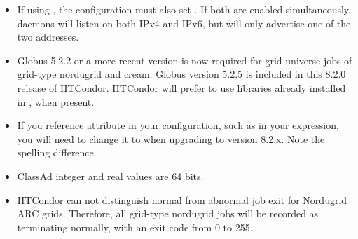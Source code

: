 \begin{itemize}
\item If using , the configuration must
also set .
If both are enabled simultaneously,
daemons will listen on both IPv4 and IPv6, 
but will only advertise one of the two addresses.

\item Globus 5.2.2 or a more recent version is now required 
for grid universe jobs of grid-type nordugrid and cream.
Globus version 5.2.5 is included in this 8.2.0 release of HTCondor.
HTCondor will prefer to use libraries already installed in ,
when present.

\item If you reference attribute  in your
	configuration, such as in your  
	expression, you will need to change it to  
	when upgrading to version 8.2.x.  Note the spelling difference.

\item ClassAd integer and real values are 64 bits.

\item HTCondor can not distinguish normal from abnormal job exit
for Nordugrid ARC grids.
Therefore, all grid-type nordugrid jobs will be recorded as 
terminating normally, with an exit code from 0 to 255.

\end{itemize}

